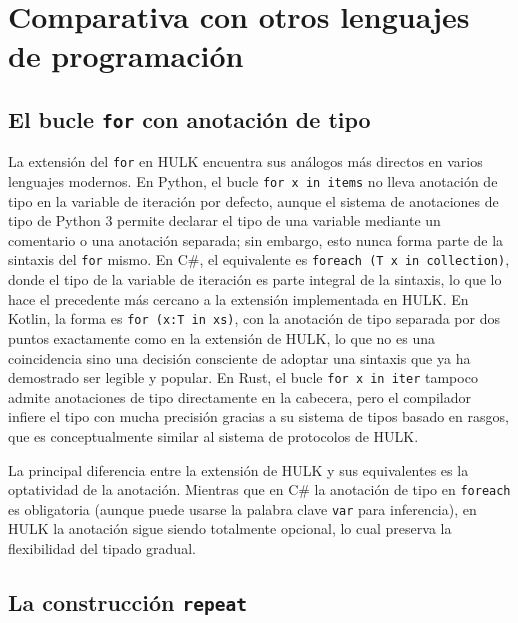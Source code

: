 \documentclass[12pt, a4paper]{article}
\begin{document}
\section{Comparativa con otros lenguajes de programación}

\subsection{El bucle \texttt{for} con anotación de tipo}

La extensión del \texttt{for} en HULK encuentra sus análogos más directos en varios lenguajes modernos. En Python, el bucle \texttt{for~x~in~items} no lleva anotación de tipo en la variable de iteración por defecto, aunque el sistema de anotaciones de tipo de Python 3 permite declarar el tipo de una variable mediante un comentario o una anotación separada; sin embargo, esto nunca forma parte de la sintaxis del \texttt{for} mismo. En C\#, el equivalente es \texttt{foreach~(T~x~in~collection)}, donde el tipo de la variable de iteración es parte integral de la sintaxis, lo que lo hace el precedente más cercano a la extensión implementada en HULK. En Kotlin, la forma es \texttt{for~(x:T~in~xs)}, con la anotación de tipo separada por dos puntos exactamente como en la extensión de HULK, lo que no es una coincidencia sino una decisión consciente de adoptar una sintaxis que ya ha demostrado ser legible y popular. En Rust, el bucle \texttt{for~x~in~iter} tampoco admite anotaciones de tipo directamente en la cabecera, pero el compilador infiere el tipo con mucha precisión gracias a su sistema de tipos basado en rasgos, que es conceptualmente similar al sistema de protocolos de HULK.

La principal diferencia entre la extensión de HULK y sus equivalentes es la optatividad de la anotación. Mientras que en C\# la anotación de tipo en \texttt{foreach} es obligatoria (aunque puede usarse la palabra clave \texttt{var} para inferencia), en HULK la anotación sigue siendo totalmente opcional, lo cual preserva la flexibilidad del tipado gradual.

\subsection{La construcción \texttt{repeat}}
\end{document}
